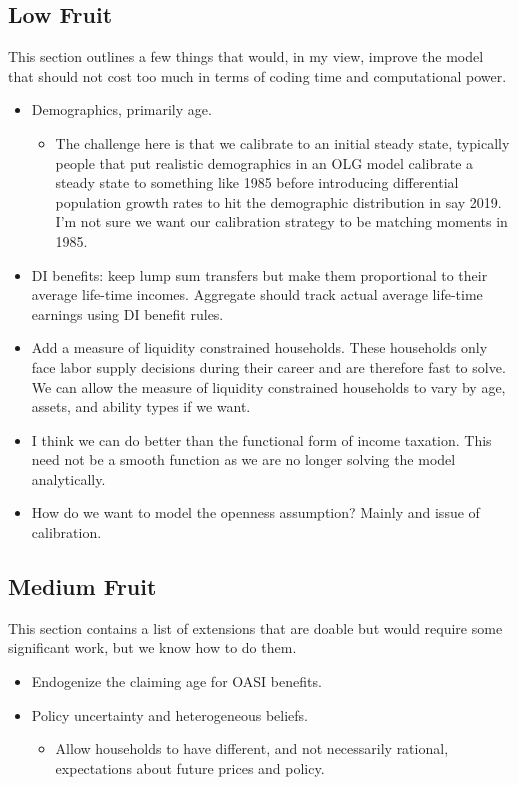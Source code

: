 \documentclass[11pt,leqno,fleqn]{article}
\begin{document}
\subsection{Low Fruit}
This section outlines a few things that would, in my view, improve the model that should not cost too much in terms of coding time and computational power.

\begin{itemize}
	\item Demographics, primarily age.
	\begin{itemize}
		\item The challenge here is that we calibrate to an initial steady state, typically people that put realistic demographics in an OLG model calibrate a steady state to something like 1985 before introducing differential population  growth rates to hit the demographic  distribution in say 2019. I'm not sure we want our calibration strategy to be matching moments in 1985.
	\end{itemize}
	\item DI benefits: keep lump sum transfers but make them proportional to their average life-time incomes. Aggregate should track actual average life-time earnings using DI benefit rules.
	\item Add a measure of liquidity constrained households. These households only face labor supply decisions during their career and are therefore fast to solve. We can allow the measure of liquidity constrained households to vary by age, assets, and ability types if we want.
	\item I think we can do better than the \citet{Gouveia.Strauss:1994} functional form of income taxation. This need not be a smooth function as we are no longer solving the model analytically.
	\item How do we want to model the openness assumption? Mainly and issue of calibration.
\end{itemize}

\subsection{Medium Fruit}
This section contains a list of extensions that are doable but would require some significant work, but we know how to do them.

\begin{itemize}
	\item Endogenize the claiming age for OASI benefits.
	\item Policy uncertainty and heterogeneous beliefs.
	\begin{itemize}
		\item Allow households to have different, and not necessarily rational, expectations about future prices and policy.
	\end{itemize}
\end{itemize}
\end{document}
